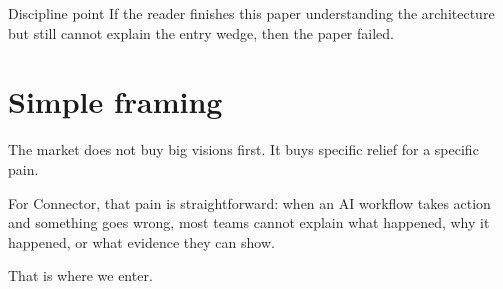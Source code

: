 \begin{warnbox}{Discipline point}
If the reader finishes this paper understanding the architecture but still cannot explain the entry wedge, then the paper failed.
\end{warnbox}

\section{Simple framing}

The market does not buy big visions first.
It buys specific relief for a specific pain.

For Connector, that pain is straightforward:
when an AI workflow takes action and something goes wrong, most teams cannot explain what happened, why it happened, or what evidence they can show.

That is where we enter.
